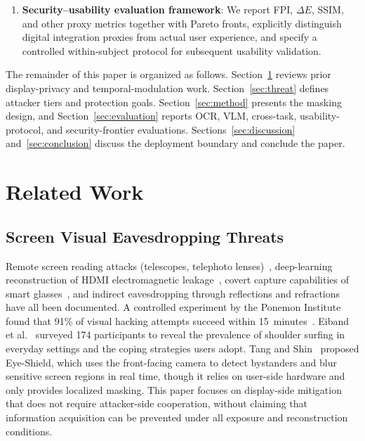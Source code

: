 \documentclass{ieeeaccess}
\begin{document}
\begin{enumerate}
\item \textbf{Security--usability evaluation framework}: We report FPI, $\Delta E$, SSIM, and other proxy metrics together with Pareto fronts, explicitly distinguish digital integration proxies from actual user experience, and specify a controlled within-subject protocol for subsequent usability validation.
\end{enumerate}

The remainder of this paper is organized as follows. Section~\ref{sec:related} reviews prior display-privacy and temporal-modulation work. Section~\ref{sec:threat} defines attacker tiers and protection goals. Section~\ref{sec:method} presents the masking design, and Section~\ref{sec:evaluation} reports OCR, VLM, cross-task, usability-protocol, and security-frontier evaluations. Sections~\ref{sec:discussion} and~\ref{sec:conclusion} discuss the deployment boundary and conclude the paper.


\section{Related Work}
\label{sec:related}

\subsection{Screen Visual Eavesdropping Threats}

Remote screen reading attacks (telescopes, telephoto lenses)~\cite{b_backes2009}, deep-learning reconstruction of HDMI electromagnetic leakage~\cite{b_fernandez2024}, covert capture capabilities of smart glasses~\cite{b_wang2026}, and indirect eavesdropping through reflections and refractions~\cite{b_raguram2011} have all been documented. A controlled experiment by the Ponemon Institute found that 91\% of visual hacking attempts succeed within 15~minutes~\cite{b_ponemon2016}. Eiband et al.~\cite{b_eiband2017} surveyed 174 participants to reveal the prevalence of shoulder surfing in everyday settings and the coping strategies users adopt. Tang and Shin~\cite{b_tang2023} proposed Eye-Shield, which uses the front-facing camera to detect bystanders and blur sensitive screen regions in real time, though it relies on user-side hardware and only provides localized masking. This paper focuses on display-side mitigation that does not require attacker-side cooperation, without claiming that information acquisition can be prevented under all exposure and reconstruction conditions.
\end{document}
